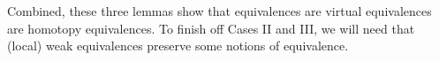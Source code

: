 \documentclass[a4paper,10pt
,draft
]{article}%
\newcommand{\J}{\mathbb J}
\renewcommand{\1}{\eta}%
\begin{document}

Combined, these three lemmas show that equivalences are virtual equivalences are homotopy equivalences.
%
To finish off Cases II and III, we will need that (local) weak equivalences preserve some notions of equivalence.
\end{document}

